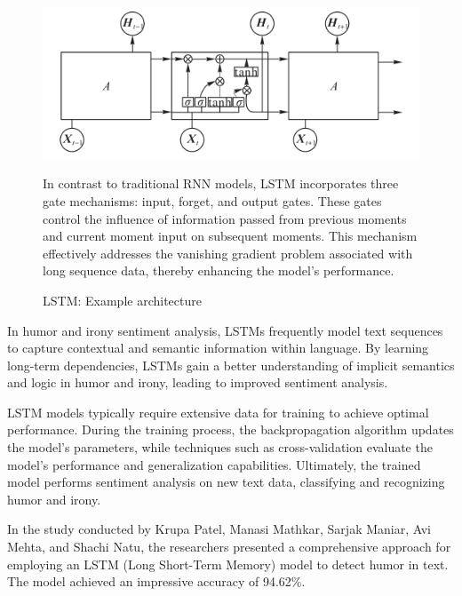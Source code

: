 \documentclass[a4paper]{article}
\begin{document}
\begin{figure}[H]
    \centering
    \begin{minipage}{0.48\textwidth}
        \centering
        \includegraphics[width=1\textwidth]{./images/LSTM_architecture.png}
        \caption{LSTM: Example architecture \cite{ref_rnn1}}
        \label{fig.LSTM}
    \end{minipage}\hfill
    \begin{minipage}{0.48\textwidth}
        In contrast to traditional RNN models, LSTM incorporates three gate mechanisms: input, forget, and output gates. These gates control the influence of information passed from previous moments and current moment input on subsequent moments. This mechanism effectively addresses the vanishing gradient problem associated with long sequence data, thereby enhancing the model's performance.
    \end{minipage}
\end{figure}

In humor and irony sentiment analysis, LSTMs frequently model text sequences to capture contextual and semantic information within language. By learning long-term dependencies, LSTMs gain a better understanding of implicit semantics and logic in humor and irony, leading to improved sentiment analysis.

LSTM models typically require extensive data for training to achieve optimal performance. During the training process, the backpropagation algorithm updates the model's parameters, while techniques such as cross-validation evaluate the model's performance and generalization capabilities. Ultimately, the trained model performs sentiment analysis on new text data, classifying and recognizing humor and irony.

In the study conducted by Krupa Patel, Manasi Mathkar, Sarjak Maniar, Avi Mehta, and Shachi Natu, the researchers presented a comprehensive approach for employing an LSTM (Long Short-Term Memory) model to detect humor in text. The model achieved an impressive accuracy of 94.62\%.\cite{ref_rnn3}
\end{document}
